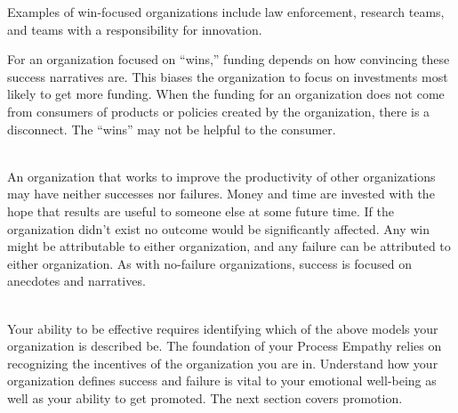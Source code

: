 Examples of win-focused organizations include law enforcement, research teams, and teams with a responsibility for innovation. 

For an organization focused on ``wins,'' funding depends on how convincing these success narratives are. This biases the organization to focus on investments most likely to get more funding. When the funding for an organization does not come from consumers of products or policies created by the organization, there is a disconnect. The ``wins'' may not be helpful to the consumer.


\ \\

An organization that works to improve the productivity of other organizations may have neither successes nor failures. Money and time are invested with the hope that results are useful to someone else at some future time. If the organization didn't exist no outcome would be significantly affected. Any win might be attributable to either organization, and any failure can be attributed to either organization. As with no-failure organizations, success is focused on anecdotes and narratives. 

\ \\

Your ability to be effective requires identifying which of the above models your organization is described be. The foundation of your Process Empathy relies on recognizing the incentives of the organization you are in.
Understand how your organization defines success and failure is vital to your emotional well-being as well as your ability to get promoted. The next section covers promotion.